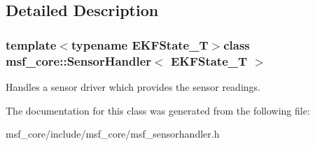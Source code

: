 \subsection{Detailed Description}
\subsubsection*{template$<$typename E\-K\-F\-State\-\_\-\-T$>$class msf\-\_\-core\-::\-Sensor\-Handler$<$ E\-K\-F\-State\-\_\-\-T $>$}

Handles a sensor driver which provides the sensor readings. 

The documentation for this class was generated from the following file\-:\begin{DoxyCompactItemize}
\item 
msf\-\_\-core/include/msf\-\_\-core/msf\-\_\-sensorhandler.\-h\end{DoxyCompactItemize}
